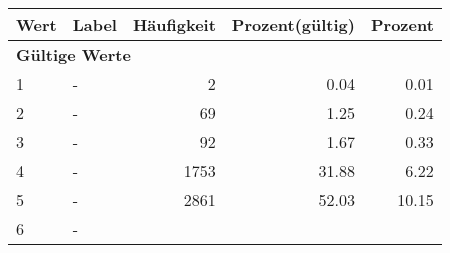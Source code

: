      \begin{longtable}{lXrrr}
     \toprule
     \textbf{Wert} & \textbf{Label} & \textbf{Häufigkeit} & \textbf{Prozent(gültig)} & \textbf{Prozent} \\
     \endhead
     \midrule
     \multicolumn{5}{l}{\textbf{Gültige Werte}}\\

     1 &
     \multicolumn{1}{X}{ -  } &


       \num{2} &
       \num[round-mode=places,round-precision=2]{0.04} &
         \num[round-mode=places,round-precision=2]{0.01} \\

     2 &
     \multicolumn{1}{X}{ -  } &


       \num{69} &
       \num[round-mode=places,round-precision=2]{1.25} &
         \num[round-mode=places,round-precision=2]{0.24} \\

     3 &
     \multicolumn{1}{X}{ -  } &


       \num{92} &
       \num[round-mode=places,round-precision=2]{1.67} &
         \num[round-mode=places,round-precision=2]{0.33} \\

     4 &
     \multicolumn{1}{X}{ -  } &


       \num{1753} &
       \num[round-mode=places,round-precision=2]{31.88} &
         \num[round-mode=places,round-precision=2]{6.22} \\

     5 &
     \multicolumn{1}{X}{ -  } &


       \num{2861} &
       \num[round-mode=places,round-precision=2]{52.03} &
         \num[round-mode=places,round-precision=2]{10.15} \\

     6 &
     \multicolumn{1}{X}{ -  } &



\end{longtable}

